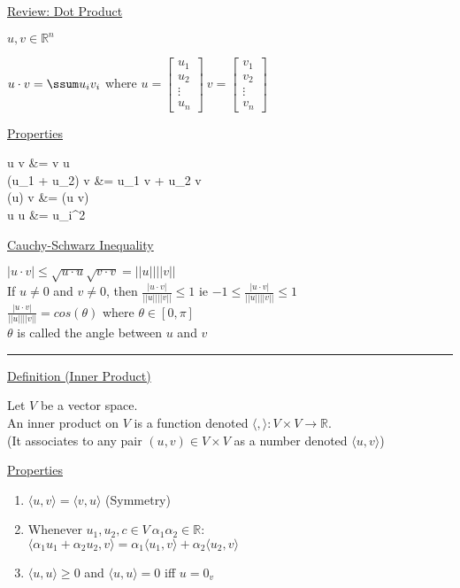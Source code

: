 \documentclass[12pt]{article}
\newcommand\m[1]{\begin{bmatrix}#1\end{bmatrix}}
\newcommand{\real}[0]{\mathbb{R}}
\newenvironment{block}[1][Label]{\underline{#1}\par}{}
\newcommand{\bbb}[1]{\left[#1\right]}
\newcommand{\abs}[1]{\left|#1\right|}
\newcommand{\ang}[1]{\langle#1\rangle}
\newcommand{\divider}[0]{\par\textcolor{lightgray}{\rule{\textwidth}{0.1pt}}}
\newenvironment{eqn}{\equation\alignedat{3}}{\endalignedat\endequation}
\begin{document}
	\begin{block}[Review: Dot Product]
	$u, v \in \real^n$
	
	$u \cdot v = \ssum u_i v_i$ where $u = \m{u_1 \\ u_2 \\ \vdots \\ u_n} \ v = \m{v_1 \\ v_2 \\ \vdots \\ v_n}$
	
	\begin{block}[Properties]
		\begin{eqn}
			u \cdot v &= v \cdot u \\
			(u_1 + u_2) \cdot v &= u_1 \cdot v + u_2 \cdot v \\
			(\alpha u) \cdot v &= \alpha (u \cdot v) \\ 
			u \cdot u &= \ssum u_i^2 
		\end{eqn}
	\end{block}
	
	\end{block}

	\begin{block}[Cauchy-Schwarz Inequality]
		$\abs{u \cdot v} \le \sqrt{u \cdot u} \sqrt{v \cdot v} = \abs{\abs{u}} \abs{\abs{v}}$ \\ 
		If $u \ne 0$ and $v \ne 0$, then $\frac{\abs{u \cdot v}}{\abs{\abs{u}} \abs{\abs{v}}} \le 1$ \quad ie $-1 \le \frac{\abs{u \cdot v}}{\abs{\abs{u}} \abs{\abs{v}}} \le 1$ \\
		$\frac{\abs{u \cdot v}}{\abs{\abs{u}} \abs{\abs{v}}} = cos(\theta)$ where $\theta \in \bbb{0, \pi}$ \\
		$\theta$ is called the angle between $u$ and $v$
	\end{block}
	
	\divider
	
	\begin{block}[Definition (Inner Product)]
		Let $V$ be a vector space. \\
		An inner product on $V$ is a function denoted $\ang{,}: V \times V \rightarrow \real$. \\
		(It associates to any pair $(u, v) \in V \times V$ as a number denoted $\ang{u, v}$)
		
		\begin{block}[Properties]
			\begin{enumerate}
				\item $\ang{u, v} = \ang{v, u}$ \quad (Symmetry)
				\item Whenever $u_1, u_2, c \in V \ \alpha_1 \alpha_2 \in \real$: \\
				$\ang{\alpha_1 u_1 + \alpha_2 u_2, v} = \alpha_1 \ang{u_1, v} + \alpha_2 \ang{u_2, v}$
				\item $\ang{u, u} \ge 0$ and $\ang{u, u} = 0$ iff $u = 0_v$
			\end{enumerate}
		\end{block}
	\end{block}
\end{document}
